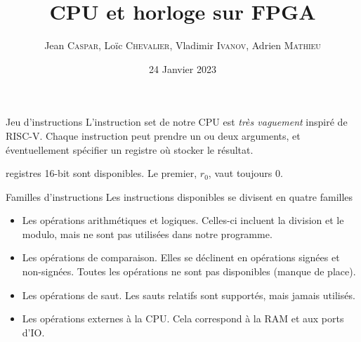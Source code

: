 \documentclass{beamer}
\title{CPU et horloge sur FPGA}
\author[%
J. \textsc{Caspar},
L. \textsc{Chevalier},
V. \textsc{Ivanov},
A. \textsc{Mathieu}%
]{
  Jean \textsc{Caspar},
  Loïc \textsc{Chevalier},
  Vladimir \textsc{Ivanov},
  Adrien \textsc{Mathieu}
}
\date{24 Janvier 2023}
\begin{document}
\begin{frame}[noframenumbering]
  \titlepage
\end{frame}

\begin{frame}[fragile]{Jeu d'instructions}
  L'instruction set de notre CPU est \emph{très vaguement} inspiré de
  RISC-V. Chaque instruction peut prendre un ou deux arguments, et
  éventuellement spécifier un registre où stocker le résultat.\par
   registres 16-bit sont disponibles. Le premier, \(r_0\), vaut
  toujours \(0\).\par
  \pause
\end{frame}

\begin{frame}[fragile]{Familles d'instructions}
  Les instructions disponibles se divisent en quatre familles\pause
  \begin{itemize}
  \item Les opérations arithmétiques et logiques. Celles-ci incluent
    la division et le modulo, mais ne sont pas utilisées dans notre
    programme.
    \pause
  \item Les opérations de comparaison. Elles se déclinent en opérations
    signées et non-signées. Toutes les opérations ne sont pas
    disponibles (manque de place).
    \pause
  \item Les opérations de saut. Les sauts relatifs sont supportés, mais
    jamais utilisés.
    \pause
  \item Les opérations externes à la CPU. Cela correspond à la RAM et
    aux ports d'IO.
  \end{itemize}
\end{frame}
\end{document}
